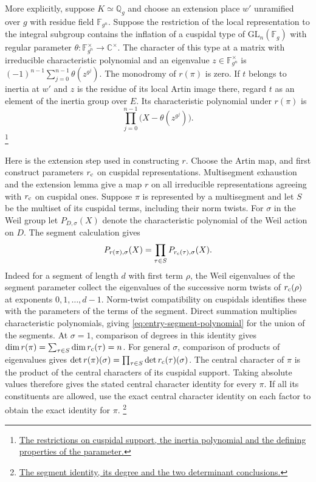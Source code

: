 More explicitly, suppose \(K\simeq\mathbb Q_g\) and choose an
extension place \(w'\) unramified over \(g\) with residue field
\(\mathbb F_{g^n}\). Suppose the restriction of the local representation
to the integral subgroup contains the inflation of a cuspidal type
of \(\mathrm{GL}_n(\mathbb F_g)\) with regular parameter
\(\theta:\mathbb F_{g^n}^{\times}\to\mathbb C^\times\).
The character of this type at a matrix with irreducible characteristic
polynomial and an eigenvalue \(z\in\mathbb F_{g^n}^{\times}\) is
\((-1)^{n-1}\sum_{j=0}^{n-1}\theta(z^{g^j})\). The monodromy of
\(r(\pi)\) is zero. If \(t\) belongs to inertia at \(w'\) and
\(z\) is the residue of its local Artin image there, regard \(t\)
as an element of the inertia group over \(E\). Its characteristic
polynomial under \(r(\pi)\) is
\[
       \prod_{j=0}^{n-1}\bigl(X-\theta(z^{g^j})\bigr).
\]
\footnote{\href{https://github.com/Deicyde/riemann-hypothesis/blob/40e56bab/src/Development/AutomorphicArithmetic/Foundations/LocalLanglands/IsRecTOfIsRec.lean\#L14-L80}{The restrictions on cuspidal support, the inertia polynomial and the defining properties of the parameter.}}

Here is the extension step used in constructing \(r\).
Choose the Artin map, and first construct parameters \(r_{\rm c}\)
on cuspidal representations. Multisegment exhaustion and the extension
lemma give a map \(r\) on all irreducible representations agreeing with
\(r_{\rm c}\) on cuspidal ones. Suppose \(\pi\) is represented by a
multisegment and let \(S\) be the multiset of its cuspidal terms,
including their norm twists. For \(\sigma\) in the Weil group let
\(P_{D,\sigma}(X)\) denote the characteristic polynomial of the Weil
action on \(D\). The segment calculation gives
\begin{equation}
\label{eq:entry-segment-polynomial}
      P_{r(\pi),\sigma}(X)
      =\prod_{\tau\in S}P_{r_{\rm c}(\tau),\sigma}(X).
\end{equation}
Indeed for a segment of length \(d\) with first term \(\rho\), the Weil
eigenvalues of the segment parameter collect the eigenvalues of the
successive norm twists of \(r_{\rm c}(\rho)\) at exponents
\(0,1,\ldots,d-1\). Norm-twist compatibility on cuspidals identifies
these with the parameters of the terms of the segment. Direct summation
multiplies characteristic polynomials, giving
\eqref{eq:entry-segment-polynomial} for the union of the segments.
At \(\sigma=1\), comparison of degrees in this identity gives
\(\dim r(\pi)=\sum_{\tau\in S}\dim r_{\rm c}(\tau)=n\). For general
\(\sigma\), comparison of products of eigenvalues gives
\(\det r(\pi)(\sigma)=\prod_{\tau\in S}\det r_{\rm c}(\tau)(\sigma)\).
The central character of \(\pi\) is the product of the central
characters of its cuspidal support. Taking absolute values therefore
gives the stated central character identity for every \(\pi\). If
all its constituents are allowed, use the exact central character
identity on each factor to obtain the exact identity for \(\pi\).
\footnote{\href{https://github.com/Deicyde/riemann-hypothesis/blob/40e56bab/src/Development/AutomorphicArithmetic/Foundations/LocalLanglands/LocalCentralUnits/ExtDim.lean\#L19-L78}{The segment identity, its degree and the two determinant conclusions.}}

